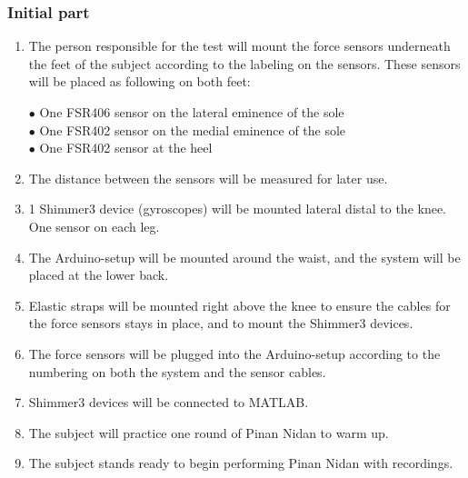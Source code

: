 \subsubsection{Initial part}
\begin{enumerate}
\item The person responsible for the test will mount the force sensors underneath the feet of the subject according to the labeling on the sensors. These sensors will be placed as following on both feet:
\begin{itemize}
$\bullet$ One FSR406 sensor on the lateral eminence of the sole \\
$\bullet$ One FSR402 sensor on the medial eminence of the sole \\
$\bullet$ One FSR402 sensor at the heel \\
\end{itemize}
\item The distance between the sensors will be measured for later use. 
\item 1 Shimmer3 device (gyroscopes) will be mounted lateral distal to the knee. One sensor on each leg.
\item The Arduino-setup will be mounted around the waist, and the system will be placed at the lower back.
\item Elastic straps will be mounted right above the knee to ensure the cables for the force sensors stays in place, and to mount the Shimmer3 devices.
\item The force sensors will be plugged into the Arduino-setup according to the numbering on both the system and the sensor cables.
\item Shimmer3 devices will be connected to MATLAB.
\item The subject will practice one round of Pinan Nidan to warm up.
\item The subject stands ready to begin performing Pinan Nidan with recordings.
\end{enumerate}


